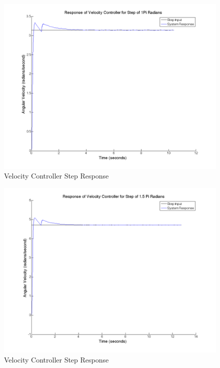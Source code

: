 \documentclass{article}
\theoremstyle{plain}
\theoremstyle{definition}
\theoremstyle{remark}
\begin{document}
\begin{figure}
\begin{center}
\includegraphics[width = 12cm]{velstepPi.png}
\caption{Velocity Controller Step Response}
\label{q6_2}
\end{center}
\end{figure}

\begin{figure}
\begin{center}
\includegraphics[width = 12cm]{velstep1_5Pi.png}
\caption{Velocity Controller Step Response}
\label{q6_3}
\end{center}
\end{figure}
\end{document}
